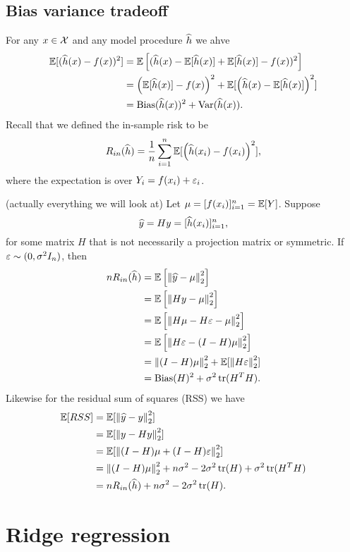 \subsection{Bias variance tradeoff}
For any $x \in {\mathcal{X}}$ and any model procedure $\widehat{h}$ we ahve 
\begin{align*}
    {\mathbb{E}}[(\widehat{h}(x)-f(x))^2]&={\mathbb{E}}\left[(\widehat{h}(x)-{\mathbb{E}}[\widehat{h}(x)]+{\mathbb{E}}[\widehat{h}(x)]-f(x))^2\right]\\
    &=\left({\mathbb{E}}[\widehat{h}(x)]-f(x)\right)^2+{\mathbb{E}}[\left(\widehat{h}(x)-{\mathbb{E}}[\widehat{h}(x)]\right)^2]\\
    &=\operatorname*{Bias}(\widehat{h}(x))^2+\operatorname{Var}(\widehat{h}(x)).
\end{align*}
Recall that we defined the in-sample risk to be
\[R_{in}(\widehat{h}) = \frac{1}{n}\sum_{i=1}^n{\mathbb{E}}[\left(\widehat{h}(x_i)-f(x_i)\right)^2], \]
where the expectation is over $Y_i = f(x_i)+\varepsilon_i$. 
\begin{ex}
    (actually everything we will look at) Let $\mu = [f(x_i)]_{i=1}^n ={\mathbb{E}}[Y]$. Suppose 
    \[\widehat{y} =Hy = [\widehat{h}(x_i)]_{i=1}^n,\] 
    for some matrix $H$ that is not necessarily a projection matrix or symmetric. If $\varepsilon \sim (0,\sigma^2I_n)$, then
    \begin{align*}
        nR_{in}(\widehat{h}) &= {\mathbb{E}}\left[\left\|\widehat{y}-\mu\right\|_2^2\right]\\
        &={\mathbb{E}}\left[\left\|Hy-\mu\right\|_2^2\right]\\
        &={\mathbb{E}}\left[\left\|H\mu-H\varepsilon-\mu\right\|_2^2\right]\\
        &={\mathbb{E}}\left[\left\|H\varepsilon-(I-H)\mu\right\|_2^2\right]\\
        &=\left\|(I-H)\mu\right\|_2^2 + {\mathbb{E}}[\left\|H\varepsilon\right\|_2^2]\\
        &=\operatorname*{Bias}(H)^2 + \sigma^2\operatorname*{tr}(H^TH).
    \end{align*} 
    Likewise for the residual sum of squares (RSS) we have
    \begin{align*}
        {\mathbb{E}}[RSS] &= {\mathbb{E}}[\left\|\widehat{y}-y\right\|_2^2]\\
        &= {\mathbb{E}}[\left\|y-Hy\right\|_2^2]\\
        &={\mathbb{E}}[\left\|(I-H)\mu+(I-H)\varepsilon\right\|_2^2]\\
        &=\left\|(I-H)\mu\right\|_2^2 + n\sigma^2-2\sigma^2 \operatorname*{tr}(H)+\sigma^2\operatorname*{tr}(H^TH)\\
        &=nR_{in}(\widehat{h})+n\sigma^2-2\sigma^2\operatorname*{tr}(H).
    \end{align*}
\end{ex}
\section{Ridge regression}

